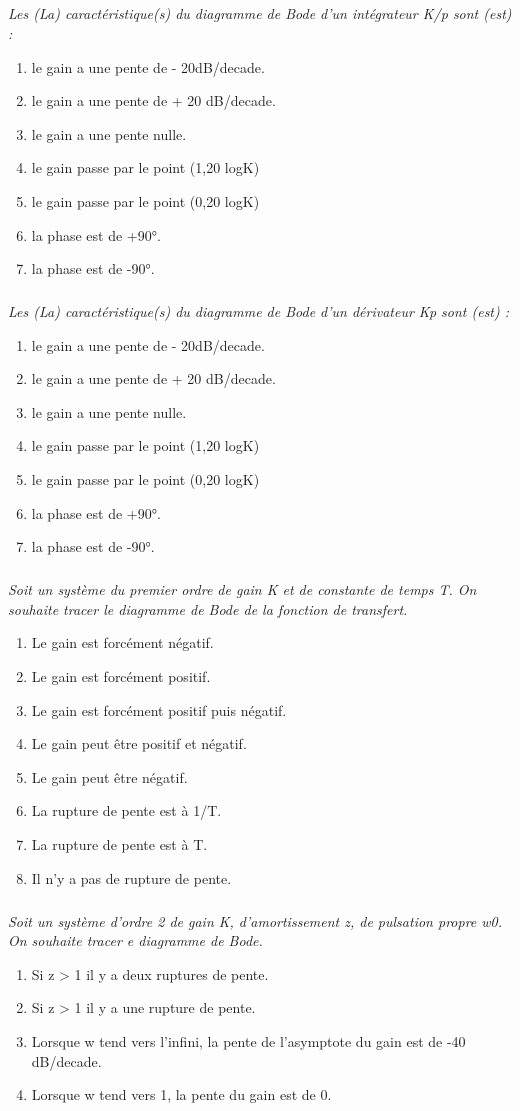 \documentclass[10pt,fleqn]{article} %
\begin{document}
\begin{multicols}{2}
\subparagraph{}\textit{Les (La) caractéristique(s) du diagramme de Bode d'un intégrateur K/p sont (est) :}
\begin{enumerate}
\item le gain a une pente de - 20dB/decade.
\item le gain a une pente de + 20 dB/decade.
\item le gain a une pente nulle.
\item le gain passe par le point (1,20 logK)
\item le gain passe par le point (0,20 logK)
\item la phase est de +90°.
\item la phase est de -90°.
\end{enumerate}

\subparagraph{}\textit{Les (La) caractéristique(s) du diagramme de Bode d'un dérivateur Kp sont (est)
:}
\begin{enumerate}
\item le gain a une pente de - 20dB/decade.
\item le gain a une pente de + 20 dB/decade.
\item le gain a une pente nulle.
\item le gain passe par le point (1,20 logK)
\item le gain passe par le point (0,20 logK)
\item la phase est de +90°.
\item la phase est de -90°.
\end{enumerate}

\subparagraph{}\textit{Soit un système du premier ordre de gain K et de constante de temps T. On
souhaite tracer le diagramme de Bode de la fonction de transfert.}
\begin{enumerate}
\item Le gain est forcément négatif.
\item Le gain est forcément positif.
\item Le gain est forcément positif puis négatif.
\item Le gain peut être positif et négatif.
\item Le gain peut être négatif.
\item La rupture de pente est à 1/T.
\item La rupture de pente est à T.
\item Il n'y a pas de rupture de pente.
\end{enumerate}

\subparagraph{}\textit{Soit un système d'ordre 2 de gain K, d'amortissement z, de pulsation propre
w0. On souhaite tracer e diagramme de Bode.}
\begin{enumerate}
\item Si z > 1 il y a deux ruptures de pente.
\item Si z > 1 il y a une rupture de pente.
\item Lorsque w tend vers l'infini, la pente de l'asymptote du gain est de -40 dB/decade.
\item Lorsque w tend vers 1, la pente du gain est de 0.
\end{enumerate}


\end{multicols}
\end{document}

